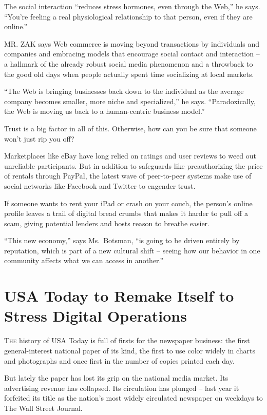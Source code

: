 ﻿\documentclass[12pt]{article}
\begin{document}
The social interaction ``reduces stress hormones, even through the Web,'' he says. ``You're feeling
a real physiological relationship to that person, even if they are online.''

MR. ZAK says Web commerce is moving beyond transactions by individuals and companies and embracing
models that encourage social contact and interaction -- a hallmark of the already robust social
media phenomenon and a throwback to the good old days when people actually spent time socializing at
local markets.

``The Web is bringing businesses back down to the individual as the average company becomes smaller,
more niche and specialized,'' he says. ``Paradoxically, the Web is moving us back to a human-centric
business model.''

Trust is a big factor in all of this. Otherwise, how can you be sure that someone won't just rip you
off?

Marketplaces like eBay have long relied on ratings and user reviews to weed out unreliable
participants. But in addition to safeguards like preauthorizing the price of rentals through PayPal,
the latest wave of peer-to-peer systems make use of social networks like Facebook and Twitter to
engender trust.

If someone wants to rent your iPad or crash on your couch, the person's online profile leaves a
trail of digital bread crumbs that makes it harder to pull off a scam, giving potential lenders and
hosts reason to breathe easier.

``This new economy,'' says Ms.~Botsman, ``is going to be driven entirely by reputation, which is
part of a new cultural shift -- seeing how our behavior in one community affects what we can access
in another.''

\pagebreak
\section{USA Today to Remake Itself to Stress Digital Operations}

\lettrine{T}{he} history of USA Today is full of firsts for the newspaper
business: the first general-interest national paper of its kind, the first to use color widely in
charts and photographs and once first in the number of copies printed each day.

But lately the paper has lost its grip on the national media market. Its advertising revenue has
collapsed. Its circulation has plunged -- last year it forfeited its title as the nation's most
widely circulated newspaper on weekdays to The Wall Street Journal.
\end{document}

